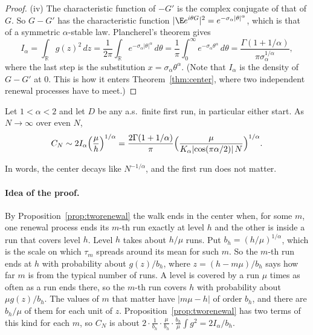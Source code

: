 \begin{proof}
(iv) The characteristic function of $-G'$ is the complex conjugate of that
of $G$. So $G-G'$ has the characteristic function
$\lvert\E e^{i\theta G}\rvert^2=e^{-\sigma_\alpha\lvert\theta\rvert^\alpha}$,
which is that of a symmetric $\alpha$-stable law. Plancherel's theorem gives
\[
 I_\alpha=\int_{\mathbb R}g(z)^2\,dz
 =\frac1{2\pi}\int_{\mathbb R}e^{-\sigma_\alpha\lvert\theta\rvert^\alpha}\,d\theta
 =\frac1\pi\int_0^\infty e^{-\sigma_\alpha\theta^\alpha}\,d\theta
 =\frac{\Gamma(1+1/\alpha)}{\pi\sigma_\alpha^{1/\alpha}} ,
\]
where the last step is the substitution $x=\sigma_\alpha\theta^\alpha$. (Note
that $I_\alpha$ is the density of $G-G'$ at $0$. This is how it enters
Theorem~\ref{thm:center}, where two independent renewal processes have to
meet.)
\end{proof}

\begin{theorem}\label{thm:center}
Let $1<\alpha<2$ and let $D$ be any a.s.\ finite first run, in particular
either start. As $N\to\infty$ over even $N$,
\[
 C_N\sim2I_\alpha\Bigl(\frac{\mu}{h}\Bigr)^{1/\alpha}
 =\frac{2\Gamma(1+1/\alpha)}{\pi}\Bigl(\frac{\mu}{K_\alpha\lvert\cos(\pi
 \alpha/2)\rvert\,N}\Bigr)^{1/\alpha}.
\]
\end{theorem}

In words, the center decays like $N^{-1/\alpha}$, and the first run does not
matter.

\paragraph{Idea of the proof.}
By Proposition~\ref{prop:tworenewal} the walk ends in the center when, for
some $m$, one renewal process ends its $m$-th run exactly at level $h$ and
the other is inside a run that covers level $h$. Level $h$ takes about
$h/\mu$ runs. Put $b_h=(h/\mu)^{1/\alpha}$, which is the scale on which
$\tau_m$ spreads around its mean for such $m$. So the $m$-th run ends at $h$
with probability about $g(z)/b_h$, where $z=(h-m\mu)/b_h$ says how far $m$ is
from the typical number of runs. A level is covered by a run $\mu$ times as
often as a run ends there, so the $m$-th run covers $h$ with probability
about $\mu g(z)/b_h$. The values of $m$ that matter have
$\lvert m\mu-h\rvert$ of order $b_h$, and there are $b_h/\mu$ of them for
each unit of $z$. Proposition~\ref{prop:tworenewal} has two terms of this
kind for each $m$, so $C_N$ is about
$2\cdot\frac1{b_h}\cdot\frac\mu{b_h}\cdot\frac{b_h}\mu\int g^2=2I_\alpha/b_h$.

